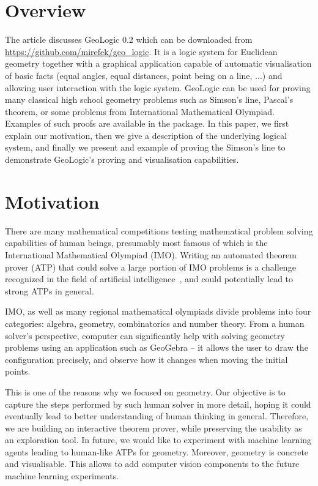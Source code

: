 \documentclass[runningheads]{llncs}
\begin{document}
\section{Overview}

The article discusses GeoLogic 0.2 which can be downloaded from
\url{https://github.com/mirefek/geo_logic}. It is a logic system for
Euclidean geometry together with a graphical application capable of
automatic visualisation of basic facts (equal angles, equal distances,
point being on a line, ...) and allowing user interaction with the
logic system. GeoLogic can be used for proving many classical high
school geometry problems such as Simson's line, Pascal's theorem, or
some problems from International Mathematical Olympiad. Examples of
such proofs are available in the package. In this paper, we first
explain our motivation, then we give a description of the underlying
logical system, and finally we present and example of proving the
Simson's line to demonstrate GeoLogic's proving and visualisation
capabilities.

\section{Motivation}

There are many mathematical competitions testing mathematical problem
solving capabilities of human beings, presumably most famous of which
is the International Mathematical Olympiad (IMO). Writing an automated
theorem prover (ATP) that could solve a large portion of IMO problems is a
challenge recognized in the field of artificial
intelligence~\cite{IMO-Challenge}, and could potentially lead to
strong ATPs in general.

IMO, as well as many regional mathematical olympiads divide problems
into four categories: algebra, geometry, combinatorics and number theory.
From a human solver's perspective, computer can significantly help
with solving geometry problems using an application such as GeoGebra --
it allows the user to draw the configuration precisely, and observe
how it changes when moving the initial points.

This is one of the reasons why we focused on geometry.
Our objective is to capture the steps performed by such human solver
in more detail, hoping it could eventually lead to better
understanding of human thinking in general.
Therefore, we are building an interactive
theorem prover, while preserving the usability as an exploration
tool. In future, we would like to experiment with machine learning
agents leading to human-like ATPs for geometry. Moreover, geometry is
concrete and visualisable. This allows to add computer vision
components to the future machine learning experiments.
\end{document}
